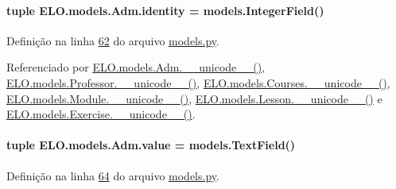 \hypertarget{classELO_1_1models_1_1Adm_af7e7b797ce5d3396e8a54d8927450d75}{
\paragraph[{identity}]{\setlength{\rightskip}{0pt plus 5cm}tuple E\-L\-O.\-models.\-Adm.\-identity = models.\-Integer\-Field()\hspace{0.3cm}{\ttfamily [static]}}}\label{classELO_1_1models_1_1Adm_af7e7b797ce5d3396e8a54d8927450d75}


Definição na linha \hyperlink{ELO_2models_8py_source_l00062}{62} do arquivo \hyperlink{ELO_2models_8py_source}{models.\-py}.



Referenciado por \hyperlink{classELO_1_1models_1_1Adm_a3541c3ae12b8d2da3f44ac6be00a23e6}{E\-L\-O.\-models.\-Adm.\-\_\-\-\_\-unicode\-\_\-\-\_\-()}, \hyperlink{classELO_1_1models_1_1Professor_aefc9d63d429e19ec3487a7879879f29d}{E\-L\-O.\-models.\-Professor.\-\_\-\-\_\-unicode\-\_\-\-\_\-()}, \hyperlink{classELO_1_1models_1_1Courses_a8926a37152be8d4fc3e0ba6af200f871}{E\-L\-O.\-models.\-Courses.\-\_\-\-\_\-unicode\-\_\-\-\_\-()}, \hyperlink{classELO_1_1models_1_1Module_a1b54aa7a5e8dac090dea0926eca5550d}{E\-L\-O.\-models.\-Module.\-\_\-\-\_\-unicode\-\_\-\-\_\-()}, \hyperlink{classELO_1_1models_1_1Lesson_a3d9f0295dbe1ed5c74668d6c0876f97c}{E\-L\-O.\-models.\-Lesson.\-\_\-\-\_\-unicode\-\_\-\-\_\-()} e \hyperlink{classELO_1_1models_1_1Exercise_af3e991e5610cec815a2c3260ec6aae0b}{E\-L\-O.\-models.\-Exercise.\-\_\-\-\_\-unicode\-\_\-\-\_\-()}.

\hypertarget{classELO_1_1models_1_1Adm_a98f249c493fbcbcd347297437a098212}{
\paragraph[{value}]{\setlength{\rightskip}{0pt plus 5cm}tuple E\-L\-O.\-models.\-Adm.\-value = models.\-Text\-Field()\hspace{0.3cm}{\ttfamily [static]}}}\label{classELO_1_1models_1_1Adm_a98f249c493fbcbcd347297437a098212}


Definição na linha \hyperlink{ELO_2models_8py_source_l00064}{64} do arquivo \hyperlink{ELO_2models_8py_source}{models.\-py}.



